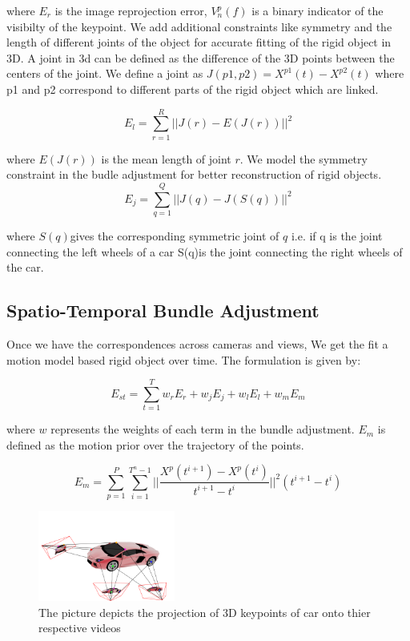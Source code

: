 \documentclass[10pt,twocolumn,letterpaper]{article}
\begin{document}
where $E_r$ is the image reprojection error, $V_n^p(f)$ is a binary indicator of the visibilty of the keypoint. We add additional constraints like symmetry and the length of different joints of the object for accurate fitting of the rigid object in 3D. A joint in 3d can be defined as the difference of the 3D points between the centers of the joint. We define a joint as $J(p1,p2) = X^{p1}(t) - X^{p2}(t) $ where p1 and p2 correspond to different parts of the rigid object which are linked. 

\begin{equation}
  	E_l = \sum_{r=1}^R ||J(r) - E(J(r))||^2  
\end{equation}

where $E(J(r))$ is the mean length of joint $r$. We model the symmetry constraint in the budle adjustment for better reconstruction of rigid objects.
\begin{equation}
  	E_j = \sum_{q = 1}^Q ||J(q) - J(S(q))||^2
\end{equation}

where $S(q)$gives the corresponding symmetric joint of $q$ i.e. if q is the joint connecting the left wheels of a car S(q)is the joint connecting the right wheels of the car.

\subsection{Spatio-Temporal Bundle Adjustment}
Once we have the correspondences across cameras and views, We get the fit a motion model based rigid object over time. The formulation is given by:

\begin{equation}
 E_{st} = \sum_{t=1}^T w_r E_r + w_j E_j + w_l E_l + w_m E_m 
\end{equation}

where $w$ represents the weights of each term in the bundle adjustment. $E_m$ is defined as the motion prior over the trajectory of the points.

\begin{equation}
E_m = \sum_{p =1 }^P \sum_{i = 1}^{T^n -1} ||\frac{X^p(t^{i+1}) - X^p(t^{i})}{t^{i+1} - t^{i}}||^2 (t^{i+1} - t^{i})
\end{equation}
\begin{figure}
  \centering
    \includegraphics[width=0.4\textwidth]{images/corr}
  \caption{The picture depicts the projection of 3D keypoints of car onto thier respective videos}
  \label{fig:corr}
\end{figure}
\end{document}
